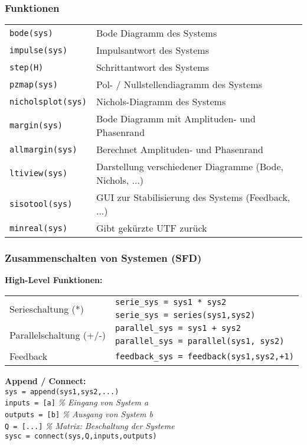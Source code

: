 \subsubsection{Funktionen}
\begin{tabular}{ll}
	\texttt{bode(sys)} & Bode Diagramm des Systems \\
	\texttt{impulse(sys)} & Impulsantwort des Systems \\
	\texttt{step(H)} & Schrittantwort des Systems \\
	\texttt{pzmap(sys)} & Pol- / Nullstellendiagramm des Systems \\
	\texttt{nicholsplot(sys)} & Nichols-Diagramm des Systems \\
	\texttt{margin(sys)} &  Bode Diagramm mit Amplituden- und Phasenrand \\
	\texttt{allmargin(sys)} & Berechnet Amplituden- und Phasenrand \\
	\texttt{ltiview(sys)} & Darstellung verschiedener Diagramme (Bode, Nichols, ...) \\
	\texttt{sisotool(sys)} & GUI zur Stabilisierung des Systems (Feedback, ...) \\
	\texttt{minreal(sys)} & Gibt gekürzte UTF zurück \\
\end{tabular}


\subsubsection{Zusammenschalten von Systemen (SFD)}
\begin{minipage}{12cm}
\textbf{High-Level Funktionen:} \\
\begin{tabular}{|l|l|} \hline
	\multirow{2}{*}{Serieschaltung (*)}
			& \texttt{serie\_sys = sys1 * sys2} \\
			& \texttt{serie\_sys = series(sys1,sys2)} \\ \hline
	\multirow{2}{*}{Parallelschaltung (+/-)}
			& \texttt{parallel\_sys = sys1 + sys2} \\
			& \texttt{parallel\_sys = parallel(sys1, sys2)} \\ \hline
	Feedback & \texttt{feedback\_sys = feedback(sys1,sys2,+1)} \\ \hline
\end{tabular}
\end{minipage}
\begin{minipage}{8cm}
\textbf{Append / Connect:} \\
	\texttt{sys = append(sys1,sys2,...)} \\
	\texttt{inputs = [a]} \textit{\% Eingang von System a} \\
	\texttt{outputs = [b]} \textit{\% Ausgang von System b} \\
	\texttt{Q = [...]}  \textit{\% Matrix: Beschaltung der Systeme} \\
	\texttt{sysc = connect(sys,Q,inputs,outputs)} \\
\end{minipage}

